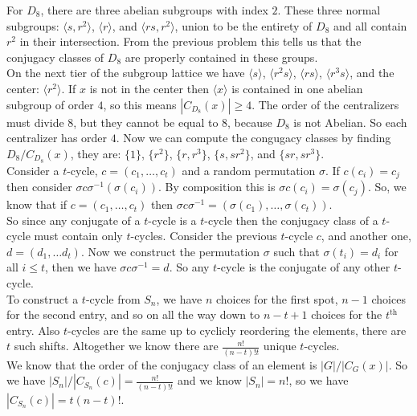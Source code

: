 \documentclass[12pt]{report}
\begin{document}
For $D_8$, there are three abelian subgroups with index $2$. These three normal
subgroups: $\langle s, r^2 \rangle$, $\langle r \rangle$, and $\langle rs, r^2
\rangle$, union to be the entirety of $D_8$ and all contain $r^2$ in their
intersection. From the previous problem this tells us that the conjugacy classes
of $D_8$ are properly contained in these groups.\\

On the next tier of the subgroup lattice we have $\langle s \rangle$, $\langle
r^2s \rangle$, $\langle rs \rangle$, $\langle r^3s \rangle$, and the center:
$\langle r^2 \rangle$. If $x$ is not in the center then $\langle x \rangle$ is
contained in one abelian subgroup of order $4$, so this means $|C_{D_8}(x)| \geq
4$. The order of the centralizers must divide $8$, but they cannot be equal to
$8$, because $D_8$ is not Abelian. So each centralizer has order $4$. Now we can
compute the congugacy classes by finding $D_8/C_{D_8}(x)$, they are: $\{ 1\}$,
$\{ r^2\}$, $\{ r,r^3\}$, $\{ s, sr^2\}$, and $\{ sr, sr^3\}$.\\


 Consider a $t$-cycle, $c = (c_1,\dots,c_t)$ and a
random permutation $\sigma$. If $c(c_i) = c_j$ then consider $\sigma c
\sigma^{-1}(\sigma(c_i))$. By composition this is $\sigma c(c_i) = \sigma(c_j)$.
So, we know that if $c = (c_1,\dots,c_t)$ then $\sigma c \sigma^{-1} =
(\sigma(c_1),\dots, \sigma(c_t))$.\\

So since any conjugate of a $t$-cycle is a $t$-cycle then the conjugacy class of
a $t$-cycle must contain only $t$-cycles. Consider the previous $t$-cycle $c$,
and another one, $d = (d_1, \dots d_t)$. Now we construct the permutation
$\sigma$ such that $\sigma(t_i) = d_i$ for all $i\leq t$, then we have $\sigma c
\sigma^{-1}=d$. So any $t$-cycle is the conjugate of any other $t$-cycle.\\

 To construct a $t$-cycle from $S_n$, we have $n$
choices for the first spot, $n-1$ choices for the second entry, and so on all
the way down to $n-t+1$ choices for the $t^{\textrm{th}}$ entry. Also $t$-cycles
are the same up to cyclicly reordering the elements, there are $t$ such shifts.
Altogether we know there are $\frac{n!}{(n-t)!t}$ unique $t$-cycles.\\

We know that the order of the conjugacy class of an element is $|G|/|C_G(x)|$.
So we have $|S_n|/|C_{S_n}(c)| = \frac{n!}{(n-t)!t}$ and we know $|S_n| = n!$,
so we have $|C_{S_n}(c)| = t(n-t)!$.\\
\end{document}

